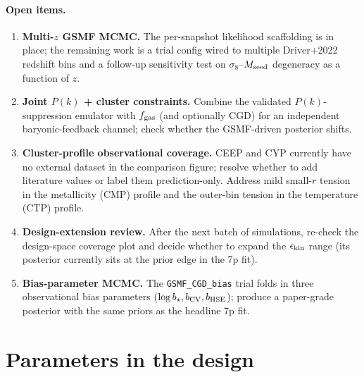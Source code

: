 \documentclass{article}
\begin{document}
\paragraph{Open items.}
\begin{enumerate}
    \item \textbf{Multi-$z$ GSMF MCMC.} The per-snapshot likelihood scaffolding is in place; the remaining work is a trial config wired to multiple Driver+2022 redshift bins and a follow-up sensitivity test on $\sigma_8$--$M_{\rm seed}$ degeneracy as a function of $z$.
    \item \textbf{Joint $P(k)$ + cluster constraints.} Combine the validated $P(k)$-suppression emulator with $f_{\rm gas}$ (and optionally CGD) for an independent baryonic-feedback channel; check whether the GSMF-driven posterior shifts.
    \item \textbf{Cluster-profile observational coverage.} CEEP and CYP currently have no external dataset in the comparison figure; resolve whether to add literature values or label them prediction-only. Address mild small-$r$ tension in the metallicity (CMP) profile and the outer-bin tension in the temperature (CTP) profile.
    \item \textbf{Design-extension review.} After the next batch of simulations, re-check the design-space coverage plot and decide whether to expand the $\epsilon_{\rm kin}$ range (its posterior currently sits at the prior edge in the 7p fit).
    \item \textbf{Bias-parameter MCMC.} The \texttt{GSMF\_CGD\_bias} trial folds in three observational bias parameters ($\log b_\star, b_{\rm CV}, b_{\rm HSE}$); produce a paper-grade posterior with the same priors as the headline 7p fit.
\end{enumerate}


\section{Parameters in the design}
\label{appendix:params}
\newcommand{\DesignTableSlice}[4]{%
\begin{table}
\centering
\caption{#4}
\label{#3}
\pgfplotstabletypeset[
  col sep=comma,
  columns/kappa_W/.style={column name=$\kappa_w$},
  columns/e_W/.style={column name=$e_w$},
  columns/M_seed/.style={column name=$M_\mathrm{seed}$},
  columns/v_kin/.style={column name=$v_\mathrm{kin}$},
  columns/eps_kin/.style={column name=$\epsilon_\mathrm{kin}$},
  columns/omega_m/.style={column name=$\omega_m$},
  columns/sigma_8/.style={column name=$\sigma_8$},
  every head row/.style={before row=\toprule, after row=\midrule},
  every last row/.style={after row=\bottomrule},
  row predicate/.code={%
    \ifnum\pgfplotstablerow<#1\relax\pgfplotstableuserowfalse\fi
    \ifnum\pgfplotstablerow>#2\relax\pgfplotstableuserowfalse\fi
  },
]{FinalDesign.txt}
\end{table}
}
\end{document}
